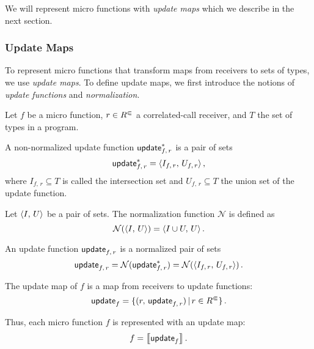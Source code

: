 We will represent micro functions with \textit{update maps} which we describe in the next section.

\subsubsection{Update Maps}
To represent micro functions that transform maps from receivers to sets of types, we use \textit{update maps}. To define update maps, we first introduce the notions of \textit{update functions} and \textit{normalization}.

Let $f$ be a micro function, $r\in{R^\Subset}$ a correlated-call receiver, and $T$ the set of types in a program.

\begin{definition}
  A non-normalized update function $\textsf{update}_{f,\,r}^*$ is a pair of sets
  \begin{equation}
    \textsf{update}_{f,\,r}^*=\left\langle I_{f,\,r},\,U_{f,\,r}\right\rangle,
  \end{equation}
  where $I_{f,\,r}\subseteq T$ is called the intersection set and $U_{f,\,r}\subseteq T$ the union set of the update function.
\end{definition}

\begin{definition}
  Let $\left\langle I,\,U\right\rangle$ be a pair of sets. The normalization function $\mathcal N$ is defined as
    \begin{equation}
        \mathcal N(\left\langle I,\,U\right\rangle)=\left\langle I\cup U,\,U\right\rangle.
    \end{equation}
\end{definition}

\begin{definition}\label{def:updfun}
  An update function $\textsf{update}_{f,\,r}$ is a normalized pair of sets
  \begin{equation}
    \textsf{update}_{f,\,r}=\mathcal N(\textsf{update}_{f,\,r}^*)=\mathcal N(\left\langle I_{f,\,r},\,U_{f,\,r}\right\rangle)\,.
  \end{equation}
\end{definition}

\begin{definition}
  The update map of $f$ is a map from receivers to update functions:
  \begin{equation}
    \textsf{update}_{f}=\{(r,\,\textsf{update}_{f,\,r})\,|\,r\in{R^\Subset}\}\,.
  \end{equation}
\end{definition}
Thus, each micro function $f$ is represented with an update map:
\begin{equation}
  f=\left\llbracket\textsf{update}_{f}\right\rrbracket.
\end{equation}

